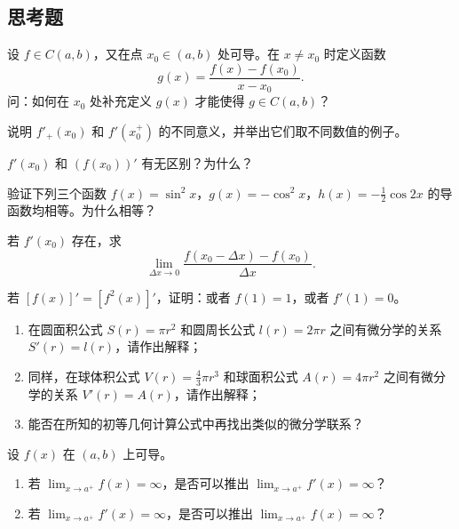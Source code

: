 \subsection{思考题}

\begin{xthought}[1]
设 $f\in C(a,b)$，又在点 $x_0\in(a,b)$ 处可导。在 $x\ne x_0$ 时定义函数
  \[
    g(x)=\frac{f(x)-f(x_0)}{x-x_0}.
  \]
  问：如何在 $x_0$ 处补充定义 $g(x)$ 才能使得 $g\in C(a,b)$？
\end{xthought}

\begin{xthought}[2]
说明 $f'_+(x_0)$ 和 $f'(x_0^+)$ 的不同意义，并举出它们取不同数值的例子。
\end{xthought}

\begin{xthought}[3]
$f'(x_0)$ 和 $(f(x_0))'$ 有无区别？为什么？
\end{xthought}

\begin{xthought}[4]
验证下列三个函数 $f(x)=\sin^2x$，$g(x)=-\cos^2x$，$h(x)=-\frac12\cos2x$ 的导函数均相等。为什么相等？
\end{xthought}

\begin{xthought}[5]
若 $f'(x_0)$ 存在，求
  \[
    \lim_{\Delta x\to0}\frac{f(x_0-\Delta x)-f(x_0)}{\Delta x}.
  \]
\end{xthought}

\begin{xthought}[6]
若 $[f(x)]'=[f^2(x)]'$，证明：或者 $f(1)=1$，或者 $f'(1)=0$。
\end{xthought}

\begin{xthought}[7]
\begin{enumerate}[label=(\arabic*)]
    \item 在圆面积公式 $S(r)=\pi r^2$ 和圆周长公式 $l(r)=2\pi r$ 之间有微分学的关系 $S'(r)=l(r)$，请作出解释；
    \item 同样，在球体积公式 $V(r)=\frac43\pi r^3$ 和球面积公式 $A(r)=4\pi r^2$ 之间有微分学的关系 $V'(r)=A(r)$，请作出解释；
    \item 能否在所知的初等几何计算公式中再找出类似的微分学联系？
  \end{enumerate}
\end{xthought}

\begin{xthought}[8]
设 $f(x)$ 在 $(a,b)$ 上可导。
  \begin{enumerate}[label=(\arabic*)]
    \item 若 $\lim_{x\to a^+}f(x)=\infty$，是否可以推出 $\lim_{x\to a^+}f'(x)=\infty$？
    \item 若 $\lim_{x\to a^+}f'(x)=\infty$，是否可以推出 $\lim_{x\to a^+}f(x)=\infty$？
  \end{enumerate}
\end{xthought}

